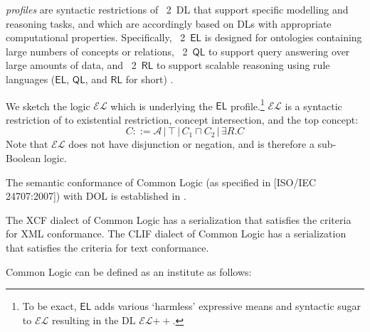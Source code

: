 \documentclass[%
\ifpretendfinal
final%
\else
draft%
\fi,
a4paper,
wd]{isov2}
\newcommand*{\nisref}[1]{[#1]}
\newcommand{\QL}{\ensuremath{\mathsf{QL}}\xspace}
\newcommand{\RL}{\ensuremath{\mathsf{RL}}\xspace}
\newcommand{\EL}{\ensuremath{\mathsf{EL}}\xspace}
\newcommand{\ELDL}{\ensuremath{\mathcal{EL}}\xspace}
\begin{document}
\begin{definition}
\OWL \emph{profiles} are syntactic restrictions of \OWL~2~DL that support specific modelling and reasoning tasks, %
and which are accordingly based on DLs with appropriate computational properties. Specifically, \OWL~2~\EL is designed for ontologies containing large numbers of concepts or relations, \OWL~2~\QL to support query answering over large amounts of data, and \OWL~2~\RL to support scalable reasoning using rule languages (\EL, \QL, and \RL for short) .
 
We sketch the logic \ELDL which is underlying the \EL profile.\footnote{To be exact, \EL adds various `harmless' expressive means and syntactic sugar to \ELDL resulting in the DL \ELDL$++$. %
} 
\ELDL is a syntactic restriction of \ALC to existential restriction, concept
intersection, and the top concept:
$$C ::= {\mathcal A} \,|\, \top \,|\,  C_1 \sqcap C_2 \,|\, \exists R . C$$
Note that \ELDL does not have disjunction or negation, and is therefore a sub-Boolean logic.
\end{definition}


\label{a:cl}

The semantic conformance of Common Logic (as specified in \nisref{ISO/IEC 24707:2007}) with DOL is established in .

The XCF dialect of Common Logic has a serialization that satisfies the criteria for XML conformance.  The CLIF dialect of Common Logic has a serialization that satisfies the criteria for text conformance.

Common Logic can be defined as an institute as follows:
\end{document}
